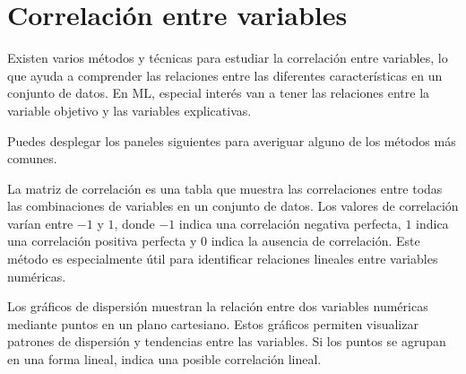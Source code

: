 \documentclass[
  letterpaper,
  DIV=11,
  numbers=noendperiod]{scrreprt}
\begin{document}
\hypertarget{correlaciuxf3n-entre-variables}{%
\section{Correlación entre
variables}\label{correlaciuxf3n-entre-variables}}

Existen varios métodos y técnicas para estudiar la correlación entre
variables, lo que ayuda a comprender las relaciones entre las diferentes
características en un conjunto de datos. En ML, especial interés van a
tener las relaciones entre la variable objetivo y las variables
explicativas.

Puedes desplegar los paneles siguientes para averiguar alguno de los
métodos más comunes.

\begin{tcolorbox}[enhanced jigsaw, arc=.35mm, breakable, coltitle=black, left=2mm, opacityback=0, bottomtitle=1mm, colbacktitle=quarto-callout-note-color!10!white, title=\textcolor{quarto-callout-note-color}{\faInfo}\hspace{0.5em}{Matriz de correlación}, titlerule=0mm, colback=white, colframe=quarto-callout-note-color-frame, bottomrule=.15mm, rightrule=.15mm, opacitybacktitle=0.6, toptitle=1mm, toprule=.15mm, leftrule=.75mm]

La matriz de correlación es una tabla que muestra las correlaciones
entre todas las combinaciones de variables en un conjunto de datos. Los
valores de correlación varían entre \(-1\) y \(1\), donde \(-1\) indica
una correlación negativa perfecta, \(1\) indica una correlación positiva
perfecta y \(0\) indica la ausencia de correlación. Este método es
especialmente útil para identificar relaciones lineales entre variables
numéricas.

\end{tcolorbox}

\begin{tcolorbox}[enhanced jigsaw, arc=.35mm, breakable, coltitle=black, left=2mm, opacityback=0, bottomtitle=1mm, colbacktitle=quarto-callout-note-color!10!white, title=\textcolor{quarto-callout-note-color}{\faInfo}\hspace{0.5em}{Gráficos de dispersión}, titlerule=0mm, colback=white, colframe=quarto-callout-note-color-frame, bottomrule=.15mm, rightrule=.15mm, opacitybacktitle=0.6, toptitle=1mm, toprule=.15mm, leftrule=.75mm]

Los gráficos de dispersión muestran la relación entre dos variables
numéricas mediante puntos en un plano cartesiano. Estos gráficos
permiten visualizar patrones de dispersión y tendencias entre las
variables. Si los puntos se agrupan en una forma lineal, indica una
posible correlación lineal.

\end{tcolorbox}
\end{document}
